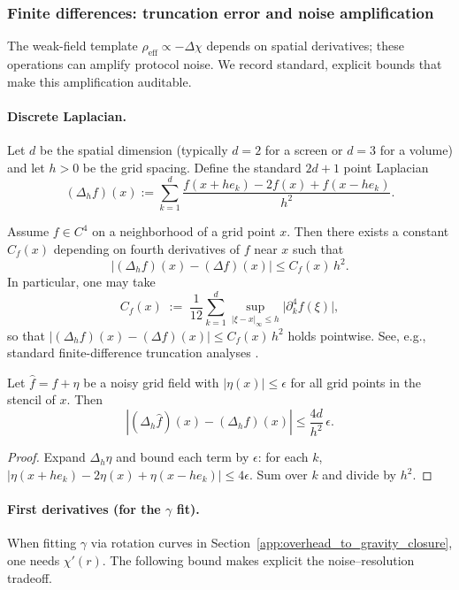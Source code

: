 \subsubsection{Finite differences: truncation error and noise amplification}
\label{subsec:prot_to_cont_finite_differences}

The weak-field template $\rho_{\mathrm{eff}}\propto -\Delta\chi$ depends on spatial derivatives; these operations can amplify protocol noise.
We record standard, explicit bounds that make this amplification auditable.

\paragraph{Discrete Laplacian.}
Let $d$ be the spatial dimension (typically $d=2$ for a screen or $d=3$ for a volume) and let $h>0$ be the grid spacing.
Define the standard $2d{+}1$ point Laplacian
\[
(\Delta_h f)(x)
:=\sum_{k=1}^{d}\frac{f(x+h e_k)-2f(x)+f(x-h e_k)}{h^2}.
\]

\begin{theorem}\label{thm:laplacian_truncation}
Assume $f\in C^4$ on a neighborhood of a grid point $x$.
Then there exists a constant $C_f(x)$ depending on fourth derivatives of $f$ near $x$ such that
\[
|(\Delta_h f)(x)-(\Delta f)(x)|
\le
C_f(x)\,h^2.
\]
In particular, one may take
\[
C_f(x)
\;:=\;
\frac{1}{12}\sum_{k=1}^{d}\sup_{|\xi-x|_\infty\le h}\bigl|\partial_k^4 f(\xi)\bigr|,
\]
so that $|(\Delta_h f)(x)-(\Delta f)(x)|\le C_f(x)\,h^2$ holds pointwise.
See, e.g., standard finite-difference truncation analyses \cite{LeVeque2007FDM}.
\end{theorem}

\begin{corollary}\label{cor:laplacian_noise_amplification}
Let $\widehat f=f+\eta$ be a noisy grid field with $|\eta(x)|\le \epsilon$ for all grid points in the stencil of $x$.
Then
\[
|(\Delta_h\widehat f)(x)-(\Delta_h f)(x)|
\le
\frac{4d}{h^2}\,\epsilon.
\]
\end{corollary}
\begin{proof}
Expand $\Delta_h\eta$ and bound each term by $\epsilon$:
for each $k$, $|\eta(x{+}h e_k)-2\eta(x)+\eta(x{-}h e_k)|\le 4\epsilon$.
Sum over $k$ and divide by $h^2$.
\end{proof}

\paragraph{First derivatives (for the \texorpdfstring{$\gamma$}{gamma} fit).}
When fitting $\gamma$ via rotation curves in Section~\ref{app:overhead_to_gravity_closure}, one needs $\chi'(r)$.
The following bound makes explicit the noise--resolution tradeoff.

